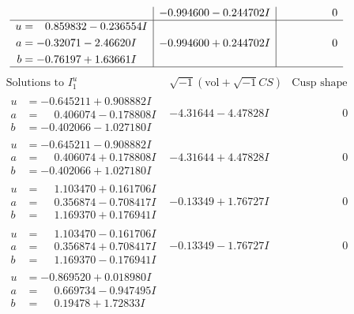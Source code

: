 \documentclass[1p]{elsarticle_modified}
\theoremstyle{definition}
\newcommand{\I}{\sqrt{-1}}
\begin{document}
$$\begin{array}{c|c|c}
 & -0.994600 - 0.244702 I & \phantom{-0.000000 } 0 \\ \hline\begin{aligned}
u &= \phantom{-}0.859832 - 0.236554 I \\
a &= -0.32071 - 2.46620 I \\
b &= -0.76197 + 1.63661 I\end{aligned}
 & -0.994600 + 0.244702 I & \phantom{-0.000000 } 0\\
 \hline 
 \end{array}$$\newpage$$\begin{array}{c|c|c}  
\text{Solutions to }I^u_{1}& \I (\text{vol} + \sqrt{-1}CS) & \text{Cusp shape}\\
 \hline 
\begin{aligned}
u &= -0.645211 + 0.908882 I \\
a &= \phantom{-}0.406074 - 0.178808 I \\
b &= -0.402066 - 1.027180 I\end{aligned}
 & -4.31644 - 4.47828 I & \phantom{-0.000000 } 0 \\ \hline\begin{aligned}
u &= -0.645211 - 0.908882 I \\
a &= \phantom{-}0.406074 + 0.178808 I \\
b &= -0.402066 + 1.027180 I\end{aligned}
 & -4.31644 + 4.47828 I & \phantom{-0.000000 } 0 \\ \hline\begin{aligned}
u &= \phantom{-}1.103470 + 0.161706 I \\
a &= \phantom{-}0.356874 - 0.708417 I \\
b &= \phantom{-}1.169370 + 0.176941 I\end{aligned}
 & -0.13349 + 1.76727 I & \phantom{-0.000000 } 0 \\ \hline\begin{aligned}
u &= \phantom{-}1.103470 - 0.161706 I \\
a &= \phantom{-}0.356874 + 0.708417 I \\
b &= \phantom{-}1.169370 - 0.176941 I\end{aligned}
 & -0.13349 - 1.76727 I & \phantom{-0.000000 } 0 \\ \hline\begin{aligned}
u &= -0.869520 + 0.018980 I \\
a &= \phantom{-}0.669734 - 0.947495 I \\
b &= \phantom{-}0.19478 + 1.72833 I\end{aligned}

\end{array}$$
\end{document}
